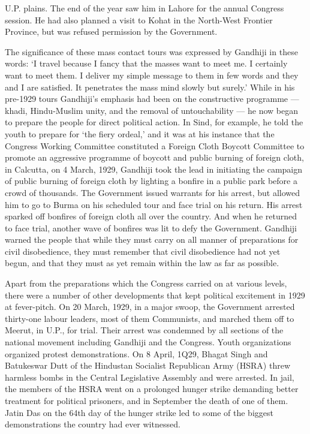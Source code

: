 \begin{multicols}{2}
U.P. plains. The end of the year saw him in Lahore for the annual Congress session. He had also planned a visit to Kohat in the North-West Frontier Province, but was refused permission by the Government. 

The significance of these mass contact tours was expressed by Gandhiji in these words: `I travel because I fancy that the masses want to meet me. I certainly want to meet them. I deliver my simple message to them in few words and they and I are satisfied. It penetrates the mass mind slowly but surely.' While in his pre-1929 tours Gandhiji's emphasis had been on the constructive programme --- khadi, Hindu-Muslim unity, and the removal of untouchability --- he now began to prepare the people for direct political action. In Sind, for example, he told the youth to prepare for `the fiery ordeal,' and it was at his instance that the Congress Working Committee constituted a Foreign Cloth Boycott Committee to promote an aggressive programme of boycott and public burning of foreign cloth, in Calcutta, on 4 March, 1929, Gandhiji took the lead in initiating the campaign of public burning of foreign cloth by lighting a bonfire in a public park before a crowd of thousands. The Government issued warrants for his arrest, but allowed him to go to Burma on his scheduled tour and face trial on his return. His arrest sparked off bonfires of foreign cloth all over the country. And when he returned to face trial, another wave of bonfires was lit to defy the Government. Gandhiji warned the people that while they must carry on all manner of preparations for civil disobedience, they must remember that civil disobedience had not yet begun, and that they must as yet remain within the law as far as possible. 

Apart from the preparations which the Congress carried on at various levels, there were a number of other developments that kept political excitement in 1929 at fever-pitch. On 20 March, 1929, in a major swoop, the Government arrested thirty-one labour leaders, most of them Communists, and marched them off to Meerut, in U.P., for trial. Their arrest was condemned by all sections of the national movement including Gandhiji and the Congress. Youth organizations organized protest demonstrations. On 8 April, 1Q29, Bhagat Singh and Batukeswar Dutt of the Hindustan Socialist Republican Army (HSRA) threw harmless bombs in the Central Legislative Assembly and were arrested. In jail, the members of the HSRA went on a prolonged hunger strike demanding better treatment for political prisoners, and in September the death of one of them. Jatin Das on the 64th day of the hunger strike led to some of the biggest demonstrations the country had ever witnessed. 


\end{multicols}
